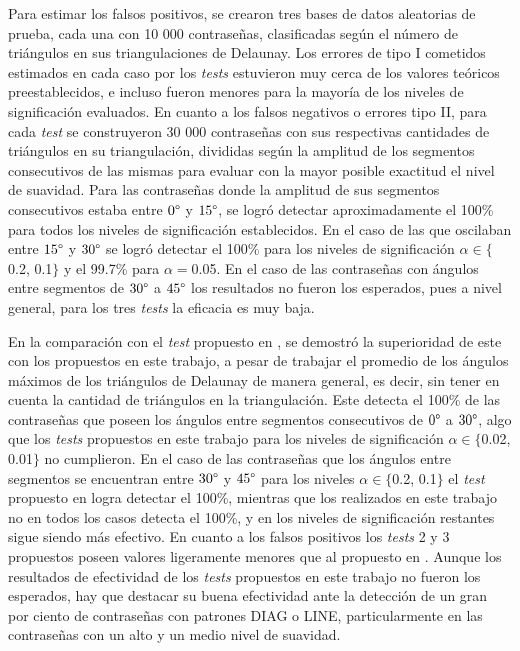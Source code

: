 \documentclass[12pt]{report}
\begin{document}
Para estimar los falsos positivos, se crearon tres bases de datos aleatorias de prueba, cada una con 10 000 contraseñas, clasificadas según el número de triángulos en sus triangulaciones de Delaunay. Los errores de tipo I cometidos estimados en cada caso por los \textit{tests} estuvieron muy cerca de los valores teóricos preestablecidos, e incluso fueron menores para la mayoría de los niveles de significación evaluados. En cuanto a los falsos negativos o errores tipo II, para cada \textit{test} se construyeron 30 000 contraseñas con sus respectivas cantidades de triángulos en  su triangulación, divididas según la amplitud de los segmentos consecutivos de las mismas para evaluar con la mayor posible exactitud el nivel de suavidad. Para las contraseñas donde  la amplitud de sus segmentos consecutivos estaba entre $0\degree$ y $15\degree$, se logró detectar aproximadamente el 100\% para todos los niveles de significación establecidos. En el caso de las que oscilaban entre $15\degree$ y $30\degree$  se logró detectar el 100\% para los niveles de significación $\alpha \in \{$0.2, 0.1$\}$ y el 99.7\% para $\alpha=$0.05. En el caso de las contraseñas con ángulos entre segmentos de $30\degree$ a $45\degree$  los resultados no fueron los esperados, pues a nivel general, para los tres \textit{tests}  la eficacia es muy baja.

En la comparación con el \textit{test} propuesto en \cite{13}, se demostró la superioridad de este con los propuestos en este trabajo, a pesar de trabajar el promedio de los ángulos máximos de los triángulos de Delaunay de manera general, es decir, sin tener en cuenta la cantidad de triángulos en  la triangulación. Este detecta el 100\% de las contraseñas que poseen los ángulos entre segmentos consecutivos de $0\degree$ a $30\degree$, algo que los \textit{tests} propuestos en este trabajo para los niveles de significación $\alpha \in \{$0.02, 0.01$\}$ no cumplieron. En el caso de las contraseñas que los ángulos entre segmentos se encuentran entre $30\degree$ y $45\degree$ para los niveles $\alpha \in \{$0.2, 0.1$\}$ el \textit{test} propuesto en \cite{13} logra detectar el 100\%, mientras que los realizados en este trabajo no en todos los casos detecta el 100\%, y en los niveles de significación restantes sigue siendo más efectivo. En cuanto a los falsos positivos los \textit{tests} 2 y 3 propuestos poseen valores ligeramente menores que al propuesto en \cite{13}. Aunque los resultados de efectividad de los \textit{tests} propuestos en este trabajo no fueron los esperados, hay que destacar su buena efectividad ante la detección de un gran por ciento de contraseñas con patrones DIAG o LINE, particularmente en las contraseñas con un alto y un medio nivel de suavidad.
\end{document}
